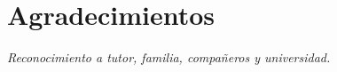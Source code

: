 \cleardoublepage

\chapter*{Agradecimientos}

\textit{Reconocimiento a tutor, familia, compañeros y universidad.}

